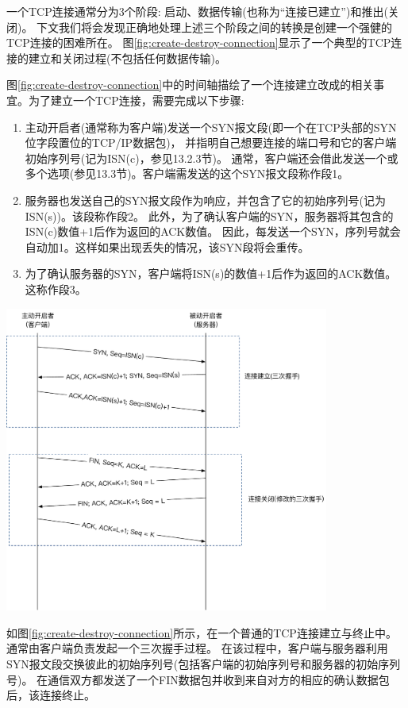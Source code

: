 \documentclass{../main.tex}{subfiles}
\begin{document}
一个TCP连接通常分为3个阶段: 启动、数据传输(也称为``连接已建立'')和推出(关闭)。
下文我们将会发现正确地处理上述三个阶段之间的转换是创建一个强健的TCP连接的困难所在。
图\ref{fig:create-destroy-connection}显示了一个典型的TCP连接的建立和关闭过程(不包括任何数据传输)。

图\ref{fig:create-destroy-connection}中的时间轴描绘了一个连接建立改成的相关事宜。为了建立一个TCP连接，需要完成以下步骤:
\begin{enumerate}
    \item 主动开启者(通常称为客户端)发送一个SYN报文段(即一个在TCP头部的SYN位字段置位的TCP/IP数据包)，
        并指明自己想要连接的端口号和它的客户端初始序列号(记为ISN(c)，参见13.2.3节)。
        通常，客户端还会借此发送一个或多个选项(参见13.3节)。客户端需发送的这个SYN报文段称作段1。
    \item 服务器也发送自己的SYN报文段作为响应，并包含了它的初始序列号(记为ISN(s))。该段称作段2。
        此外，为了确认客户端的SYN，服务器将其包含的ISN(c)数值+1后作为返回的ACK数值。
        因此，每发送一个SYN，序列号就会自动加1。这样如果出现丢失的情况，该SYN段将会重传。
    \item 为了确认服务器的SYN，客户端将ISN(s)的数值+1后作为返回的ACK数值。这称作段3。    
\end{enumerate}
\begin{center}
    \includegraphics[width=0.8\textwidth]{res/cs/net/images/create-destroy-connection.pdf}
    \label{fig:create-destroy-connection}
\end{center}

如图\ref{fig:create-destroy-connection}所示，在一个普通的TCP连接建立与终止中。
通常由客户端负责发起一个三次握手过程。
在该过程中，客户端与服务器利用SYN报文段交换彼此的初始序列号(包括客户端的初始序列号和服务器的初始序列号)。
在通信双方都发送了一个FIN数据包并收到来自对方的相应的确认数据包后，该连接终止。
\end{document}

